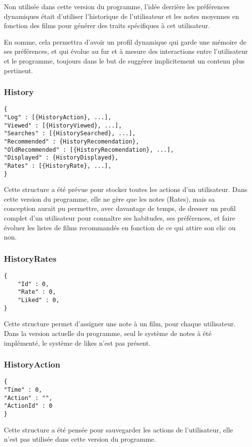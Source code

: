 Non utilisée dans cette version du programme, l'idée derrière les préférences dynamiques était d'utiliser l'historique de l'utilisateur et les notes moyennes en fonction des films pour générer des \og traits \fg spécifiques à cet utilisateur.\par
En somme, cela permettra d'avoir un profil dynamique qui garde une mémoire de ses préférences, et qui évolue au fur et à mesure des interactions entre l'utilisateur et le programme, toujours dans le but de suggérer implicitement un contenu plus pertinent.

\subsubsection{History}

\begin{lstlisting}
{
"Log" : [{HistoryAction}, ...],
"Viewed" : [{HistoryViewed}, ...],
"Searches" : [{HistorySearched}, ...],
"Recommended" : {HistoryRecomendation},
"OldRecommended" : [{HistoryRecomendation}, ...],
"Displayed" : {HistoryDisplayed},
"Rates" : [{HistoryRate}, ...],
}
\end{lstlisting}
Cette structure a été prévue pour stocker toutes les actions d'un utilisateur. Dans cette version du programme, elle ne gère que les notes (Rates), mais sa conception aurait pu permettre, avec davantage de temps, de dresser un profil complet d'un utilisateur pour connaître ses habitudes, ses préférences, et faire évoluer les listes de films recommandés en fonction de ce qui attire son clic ou non.


\subsubsection{HistoryRates}

\begin{lstlisting}
{
	"Id" : 0,
	"Rate" : 0,
	"Liked" : 0,
}
\end{lstlisting}

Cette structure permet d'assigner une note à un film, pour chaque utilisateur.
Dans la version actuelle du programme, seul le système de notes à été implémenté, le système de likes n'est pas présent.

\subsubsection{HistoryAction}
\begin{lstlisting}
{
"Time" : 0,
"Action" : "",
"ActionId" : 0
}
\end{lstlisting}
Cette structure a été pensée pour sauvegarder les actions de l'utilisateur, elle n'est pas utilisée dans cette version du programme.

